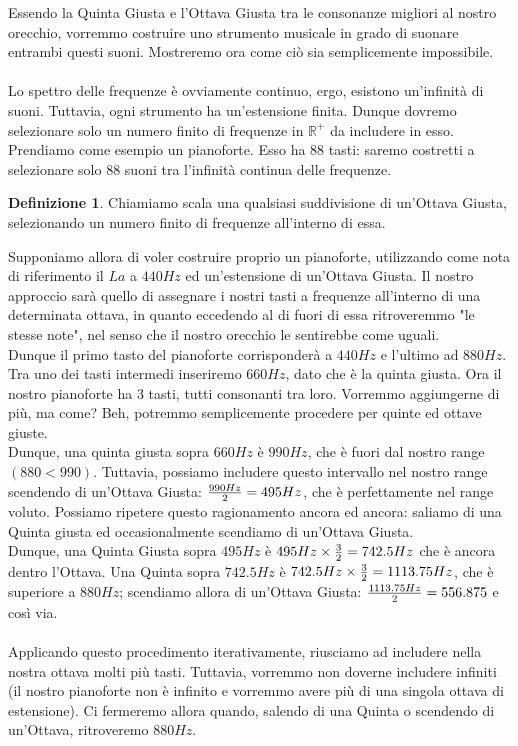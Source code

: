 \documentclass[12pt,a4paper]{book}
\theoremstyle{definition}
\newtheorem{Def}{Definizione}[chapter]
\theoremstyle{Theorem}
\theoremstyle{definition}
\theoremstyle{definition}
\theoremstyle{definition}
\begin{document}
	Essendo la Quinta Giusta e l'Ottava Giusta tra le consonanze migliori al nostro orecchio, vorremmo costruire uno strumento musicale in grado di suonare entrambi questi suoni. Mostreremo ora come ciò sia semplicemente impossibile.\\
	\\
	Lo spettro delle frequenze è ovviamente continuo, ergo, esistono un'infinità di suoni. Tuttavia, ogni strumento ha un'estensione finita. Dunque dovremo selezionare solo un numero finito di frequenze in $\mathbb{R}^+$ da includere in esso. Prendiamo come esempio un pianoforte. Esso ha 88 tasti: saremo costretti a selezionare solo 88 suoni tra l'infinità continua delle frequenze.
	\begin{Def}
		Chiamiamo scala una qualsiasi suddivisione di un'Ottava Giusta, selezionando un numero finito di frequenze all'interno di essa.
	\end{Def}
	Supponiamo allora di voler costruire proprio un pianoforte, utilizzando come nota di riferimento il $La$ a $440 Hz$ ed un'estensione di un'Ottava Giusta. Il nostro approccio sarà quello di assegnare i nostri tasti a frequenze all'interno di una determinata ottava, in quanto eccedendo al di fuori di essa ritroveremmo "le stesse note", nel senso che il nostro orecchio le sentirebbe come uguali.\\
	Dunque il primo tasto del pianoforte corrisponderà a $440 Hz$ e l'ultimo ad $880 Hz$. Tra uno dei tasti intermedi inseriremo $660 Hz$, dato che è la quinta giusta. Ora il nostro pianoforte ha 3 tasti, tutti consonanti tra loro. Vorremmo aggiungerne di più, ma come? Beh, potremmo semplicemente procedere per quinte ed ottave giuste. \\
	Dunque, una quinta giusta sopra $660 Hz$ è $990Hz$, che è fuori dal nostro range $(880<990)$. Tuttavia, possiamo includere questo intervallo nel nostro range scendendo di un'Ottava Giusta: ${990 Hz\over 2}=495 Hz$, che è perfettamente nel range voluto. Possiamo ripetere questo ragionamento ancora ed ancora: saliamo di una Quinta giusta ed occasionalmente scendiamo di un'Ottava Giusta. \\
	Dunque, una Quinta Giusta sopra $495 Hz$ è $495Hz \times {3\over 2}=742.5Hz$ che è ancora dentro l'Ottava. Una Quinta sopra $742.5 Hz$ è $742.5 Hz\times {3\over 2}=1113.75 Hz$, che è superiore a $880 Hz$; scendiamo allora di un'Ottava Giusta: ${1113.75 Hz\over 2}=556.875$ e così via.\\
	\\
	Applicando questo procedimento iterativamente, riusciamo ad includere nella nostra ottava molti più tasti. Tuttavia, vorremmo non doverne includere infiniti (il nostro pianoforte non è infinito e vorremmo avere più di una singola ottava di estensione). Ci fermeremo allora quando, salendo di una Quinta o scendendo di un'Ottava, ritroveremo $880Hz$.\\
\end{document}
